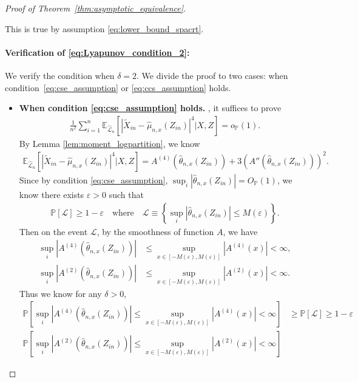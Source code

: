 \documentclass[12pt]{article}
\theoremstyle{definition}
\def\P{\mathbb{P}}
\def\P{\mathbb{P}}
\newcommand{\E}{\mathbb E}								%
\renewcommand{\P}{\mathbb{P}}							%
\newcommand{\srx}{X}									%
\newcommand{\srz}{Z}									%
\newcommand{\srxk}{\widetilde X}						%
\newcommand{\lawhat}{\widehat{\mathcal L}}				%
\begin{document}
\begin{proof}[Proof of Theorem~\ref{thm:asymptotic_equivalence}]
\begin{enumerate}
	This is true by assumption \eqref{eq:lower_bound_spacrt}.
	
	\paragraph{Verification of \eqref{eq:Lyapunov_condition_2}:}
	
	We verify the condition when $\delta=2$. We divide the proof to two cases: when condition~\eqref{eq:cse_assumption} or \eqref{eq:ccs_assumption} holds. 
	\begin{itemize}
		\item \textbf{When condition \eqref{eq:cse_assumption} holds.}
		, it suffices to prove 
	\begin{align}\label{eq:lypunov_resampling}
		\frac{1}{n^2}\sum_{i=1}^n \E_{\lawhat_n}[|\srxk_{in}-\widehat\mu_{n,x}(\srz_{in})|^4|\srx,\srz]=o_{\P}(1).
	\end{align}
	By Lemma \ref{lem:moment_logpartition}, we know 
	\begin{align*}
		\E_{\lawhat_n}[|\srxk_{in}-\widehat\mu_{n,x}(\srz_{in})|^4|\srx,\srz]=A^{(4)}(\widehat{\theta}_{n,x}(\srz_{in}))+3(A''(\widehat{\theta}_{n,x}(\srz_{in})))^2. 
	\end{align*}
	Since by condition \eqref{eq:cse_assumption}, $\sup_{i}|\widehat{\theta}_{n,x}(\srz_{in})|=O_{\P}(1)$, we know there exists $\varepsilon>0$ such that 
	\begin{align*}
		\P\left[\mathcal{L}\right]\geq 1-\varepsilon\quad\text{where}\quad\mathcal{L}\equiv \left\{\sup_{i}|\widehat{\theta}_{n,x}(\srz_{in})|\leq M(\varepsilon)\right\}.
	  \end{align*}
	  Then on the event $\mathcal{L}$, by the smoothness of function $A$, we have
	  \begin{align*}
		\sup_i|A^{(4)}(\widehat{\theta}_{n,x}(\srz_{in}))|
		&
		\leq \sup_{x\in [-M(\varepsilon),M(\varepsilon)]}|A^{(4)}(x)|<\infty,\\ 
		\sup_i|A^{(2)}(\widehat{\theta}_{n,x}(\srz_{in}))|
		&
		\leq \sup_{x\in [-M(\varepsilon),M(\varepsilon)]}|A^{(2)}(x)|<\infty.
	  \end{align*}
	  Thus we know for any $\delta>0$,
	  \begin{align*}
		\P\left[\sup_{i}|A^{(4)}(\widehat{\theta}_{n,x}(\srz_{in}))|\leq \sup_{x\in [-M(\varepsilon),M(\varepsilon)]}|A^{(4)}(x)|<\infty\right]
		&
		\geq\P[\mathcal{L}]\geq 1-\varepsilon\\
		\P\left[\sup_{i}|A^{(2)}(\widehat{\theta}_{n,x}(\srz_{in}))|\leq \sup_{x\in [-M(\varepsilon),M(\varepsilon)]}|A^{(2)}(x)|<\infty\right]

\end{align*}
\end{itemize}
\end{enumerate}
\end{proof}
\end{document}
